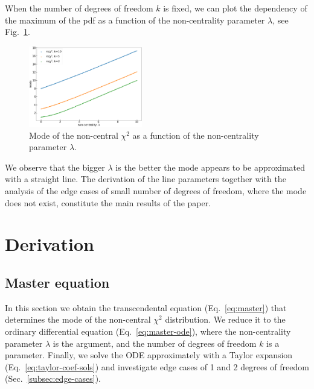 \documentclass[final,5p,twocolumn,times,authoryear]{elsarticle}
\begin{document}
When the number of degrees of freedom $k$ is fixed, we can plot the dependency of the maximum of the pdf as a function of the non-centrality parameter $\lambda$, see Fig.~\ref{fig:ncx2-max}.

\begin{figure}[h]
	\centering
 	\includegraphics[width=0.44\textwidth]{ncx2-max.png}
	\caption{Mode of the non-central $\chi^2$ as a function of the non-centrality parameter $\lambda$.}\label{fig:ncx2-max}
\end{figure}

We observe that the bigger $\lambda$ is the better the mode appears to be approximated with a straight line. The derivation of the line parameters together with the analysis of the edge cases of small number of degrees of freedom, where the mode does not exist, constitute the main results of the paper.

\section{Derivation}

\subsection{Master equation}
In this section we obtain the transcendental equation (Eq.~\ref{eq:master}) that determines the mode of the non-central $\chi^2$ distribution. We reduce it to the ordinary differential equation (Eq.~\ref{eq:master-ode}), where the non-centrality parameter $\lambda$ is the argument, and the number of degrees of freedom $k$ is a parameter. Finally, we solve the ODE approximately with a Taylor expansion (Eq.~\ref{eq:taylor-coef-sols}) and investigate edge cases of 1 and 2 degrees of freedom (Sec.~\ref{subsec:edge-cases}).
\end{document}
